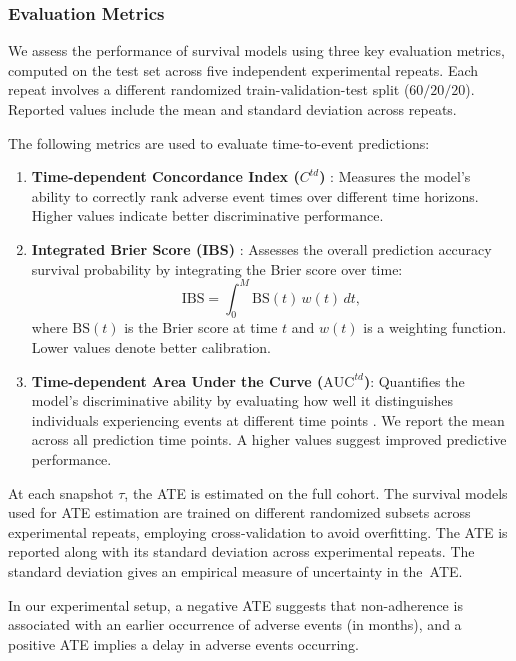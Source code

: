 \subsubsection{Evaluation Metrics}
\label{ch03:sec:eval_metrics}





We assess the performance of survival models using three key evaluation metrics, computed on the test set across five independent experimental repeats. 
Each repeat involves a different randomized train-validation-test split (\(60/20/20\)). 
Reported values include the mean and standard deviation across repeats.

The following metrics are used to evaluate time-to-event predictions:
\begin{enumerate}\renewcommand{\labelenumi}{(\roman{enumi})}\setlength{\itemsep}{0pt}
    \item \textbf{Time-dependent Concordance Index (\(C^{td}\))} \citep{antolini2005time}:  
    Measures the model’s ability to correctly rank adverse event times over different time horizons.
    Higher values indicate better discriminative performance.
    
    \item \textbf{Integrated Brier Score (IBS)} \citep{graf1999assessment}:  
    Assesses the overall prediction accuracy survival probability by integrating the Brier score over time:
    \[
    \text{IBS} = \int_{0}^{M} \text{BS}(t)\, w(t)\, dt,
    \]
    where \(\text{BS}(t)\) is the Brier score at time \(t\) and \(w(t)\) is a weighting function.
Lower values denote better calibration.
    
    \item \textbf{Time-dependent Area Under the Curve (\(\text{AUC}^{td}\))}: Quantifies the model’s discriminative ability by evaluating how well it distinguishes individuals experiencing events at different time points \citep{uno2007evaluating}. 
    We report the mean across all prediction time points. 
    A higher values suggest improved predictive performance.
\end{enumerate}

At each snapshot \(\tau\), the ATE is estimated on the full cohort.
The survival models used for ATE estimation are trained on different randomized subsets across experimental repeats, employing cross-validation to avoid overfitting. 
The ATE is reported along with its standard deviation across experimental repeats.
The standard deviation gives an empirical measure of uncertainty in the~ATE.

In our experimental setup, a negative ATE suggests that non-adherence is associated with an earlier occurrence of adverse events (in months), and a positive ATE implies a delay in adverse events occurring.

